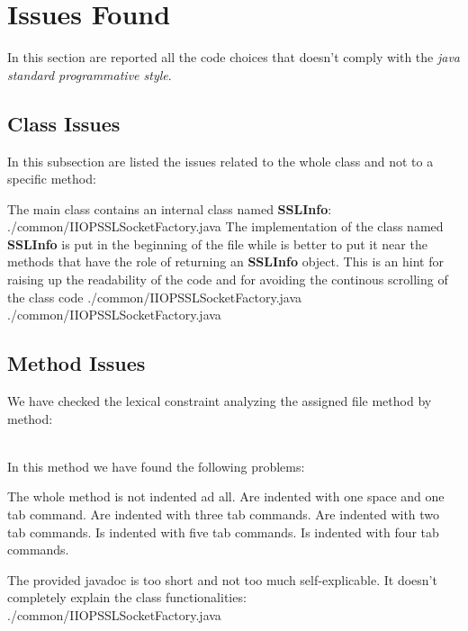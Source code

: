\section{Issues Found}
\configureJava{}
In this section are reported all the code choices that doesn't comply with the \textit{java standard programmative style}.
\subsection{Class Issues}
In this subsection are listed the issues related to the whole class and not to a specific method:
\begin{itemize}
	 The main class contains an internal class named \textbf{SSLInfo}:
	{./common/IIOPSSLSocketFactory.java}
	 The implementation of the class named \textbf{SSLInfo} is put in the beginning of the file while is better to put it near the methods that have the role of returning an \textbf{SSLInfo} object. This is an hint for raising up the readability of the code and for avoiding the continous scrolling of the class code
	{./common/IIOPSSLSocketFactory.java}
	{./common/IIOPSSLSocketFactory.java}
 \end{itemize}
\subsection{Method Issues}
We have checked the lexical constraint analyzing the assigned file method by method:
\begin{itemize}
	\\
	In this method we have found the following problems:
	\begin{itemize}
		\begin{itemize}
			 The whole method is not indented ad all.
			 Are indented with one space and one tab command.
			 Are indented with three tab commands.
			 Are indented with two tab commands.
			 Is indented with five tab commands.
			 Is indented with four tab commands.
		\end{itemize}
		 The provided javadoc is too short and not too much self-explicable. It doesn't completely explain the class functionalities:
		{./common/IIOPSSLSocketFactory.java}
	\end{itemize}
\end{itemize}